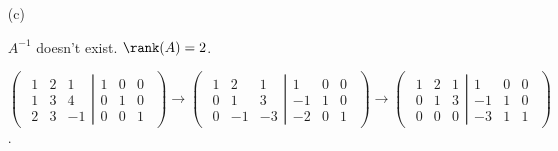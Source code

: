 \begin{Exercise}
\begin{enumerate}[(a)]
\item[(c)]
\begin{answer}
$A^{-1}$ doesn't exist. $\rank(A) = 2$.
\end{answer}
\begin{solution}
$\begin{pmatrix} \left.\begin{matrix}
1 & 2 & 1 \\
1 & 3 & 4 \\
2 & 3 & -1
\end{matrix} \right| \begin{matrix}
1 & 0 & 0 \\
0 & 1 & 0 \\
0 & 0 & 1
\end{matrix} \end{pmatrix} \longrightarrow \begin{pmatrix} \left.\begin{matrix}
1 & 2 & 1 \\
0 & 1 & 3 \\
0 & -1 & -3
\end{matrix} \right| \begin{matrix}
1 & 0 & 0 \\
-1 & 1 & 0 \\
-2 & 0 & 1
\end{matrix} \end{pmatrix} \longrightarrow \begin{pmatrix} \left.\begin{matrix}
1 & 2 & 1 \\
0 & 1 & 3 \\
0 & 0 & 0 
\end{matrix} \right| \begin{matrix}
1 & 0 & 0 \\
-1 & 1 & 0 \\
-3 & 1 & 1
\end{matrix} \end{pmatrix}$.
\end{solution}
\end{enumerate}
\end{Exercise}
